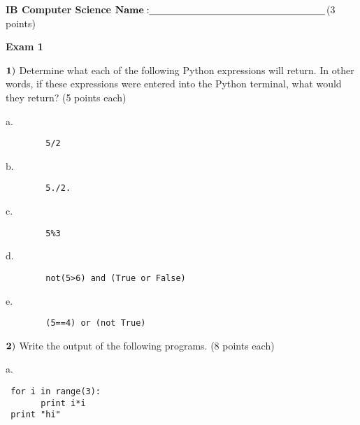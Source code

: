 \documentclass{article}
\begin{document}

\doublespacing
\textbf{IB Computer Science }                        %
 \hfill                             %
$ {\bf Name: } \underline{\hspace{2.5in}}$(3 points)

\begin{centering}
\vspace{1cm}
\textbf{Exam 1}\\
\end{centering}
\vspace{1cm}
 
$\bf{1)}$ Determine what each of the following Python expressions will return.  In other words, if these expressions were entered into the Python terminal, what would they return?
(5 points each)

\vspace{1cm}
  
 a.  
 \begin{verbatim}
 		5/2
 \end{verbatim}
 \vspace{1cm}
 
 b.   \begin{verbatim}
 		5./2.
 \end{verbatim}
  \vspace{1cm}
 
 c.  
  \begin{verbatim}
 		5%3
 \end{verbatim}
 \vspace{1cm}
  
 d. 
  \begin{verbatim}
 		not(5>6) and (True or False) 
 \end{verbatim}
 \vspace{1cm}
 
 e. 
  \begin{verbatim}
 		(5==4) or (not True) 
 \end{verbatim}
 \vspace{1cm}

  \newpage
  
 $\bf{2)}$ Write the output of the following programs. (8 points each)
 
 \vspace{1cm}

  
 a.   \begin{verbatim}
 for i in range(3):
       print i*i
 print "hi"
 \end{verbatim}
 \vspace{1cm}
 
\end{document}
